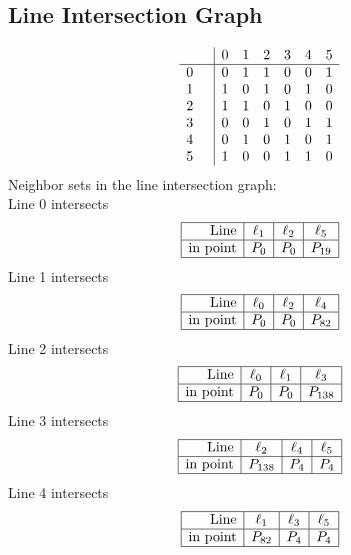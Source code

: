\documentclass{article}
\begin{document}
{\subsection*{Line Intersection Graph}
{\arraycolsep=1pt
$$
\begin{array}{rr|*{6}r}
 &  & 0 & 1 & 2 & 3 & 4 & 5\\
\hline
0 &  & 0 & 1 & 1 & 0 & 0 & 1\\
1 &  & 1 & 0 & 1 & 0 & 1 & 0\\
2 &  & 1 & 1 & 0 & 1 & 0 & 0\\
3 &  & 0 & 0 & 1 & 0 & 1 & 1\\
4 &  & 0 & 1 & 0 & 1 & 0 & 1\\
5 &  & 1 & 0 & 0 & 1 & 1 & 0\\
\end{array}
$$
}%
Neighbor sets in the line intersection graph:\\
Line 0 intersects 
$$
\begin{array}{|r*{3}{|c}|}
\hline
\mbox{Line}  & \ell_{1} & \ell_{2} & \ell_{5}\\
\hline
\mbox{in point}  & P_{0} & P_{0} & P_{19}\\
\hline
\end{array}
$$
Line 1 intersects 
$$
\begin{array}{|r*{3}{|c}|}
\hline
\mbox{Line}  & \ell_{0} & \ell_{2} & \ell_{4}\\
\hline
\mbox{in point}  & P_{0} & P_{0} & P_{82}\\
\hline
\end{array}
$$
Line 2 intersects 
$$
\begin{array}{|r*{3}{|c}|}
\hline
\mbox{Line}  & \ell_{0} & \ell_{1} & \ell_{3}\\
\hline
\mbox{in point}  & P_{0} & P_{0} & P_{138}\\
\hline
\end{array}
$$
Line 3 intersects 
$$
\begin{array}{|r*{3}{|c}|}
\hline
\mbox{Line}  & \ell_{2} & \ell_{4} & \ell_{5}\\
\hline
\mbox{in point}  & P_{138} & P_{4} & P_{4}\\
\hline
\end{array}
$$
Line 4 intersects 
$$
\begin{array}{|r*{3}{|c}|}
\hline
\mbox{Line}  & \ell_{1} & \ell_{3} & \ell_{5}\\
\hline
\mbox{in point}  & P_{82} & P_{4} & P_{4}\\
\hline
\end{array}
$$}
\end{document}
